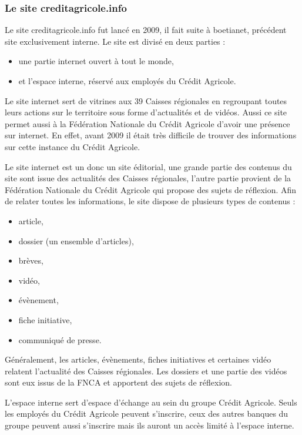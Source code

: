 \documentclass[12pt,a4paper]{article}
\begin{document}
\subsubsection{Le site creditagricole.info}
Le site creditagricole.info fut lancé en 2009, il fait suite à boetianet, précédent site exclusivement interne. Le site est divisé en deux parties :
\begin{itemize}
\item une partie internet ouvert à tout le monde,
\item et l'espace interne, réservé aux employés du Crédit Agricole.
\end{itemize}\par 
\medskip
Le site internet sert de vitrines aux 39 Caisses régionales en regroupant toutes leurs actions sur le territoire sous forme d'actualités et de vidéos. Aussi ce site permet aussi à la Fédération Nationale du Crédit Agricole d'avoir une présence sur internet. En effet, avant 2009 il était très difficile de trouver des informations sur cette instance du Crédit Agricole.\par
Le site internet est un donc un site éditorial, une grande partie des contenus du site sont issue des actualités des Caisses régionales, l'autre partie provient de la Fédération Nationale du Crédit Agricole qui propose des sujets de réflexion. Afin de relater toutes les informations, le site dispose de plusieurs types de contenus :
\begin{itemize}
\item article,
\item dossier (un ensemble d'articles),
\item brèves,
\item vidéo,
\item évènement,
\item fiche initiative,
\item communiqué de presse.
\end{itemize}\par
Généralement, les articles, évènements, fiches initiatives et certaines vidéo relatent l'actualité des Caisses régionales. Les dossiers et une partie des vidéos sont eux issus de la FNCA et apportent des sujets de réflexion.\par
\bigskip
L'espace interne sert d'espace d'échange au sein du groupe Crédit Agricole. Seuls les employés du Crédit Agricole peuvent s'inscrire, ceux des autres banques du groupe peuvent aussi s'inscrire mais ils auront un accès limité à l'espace interne.\par 
\end{document}
